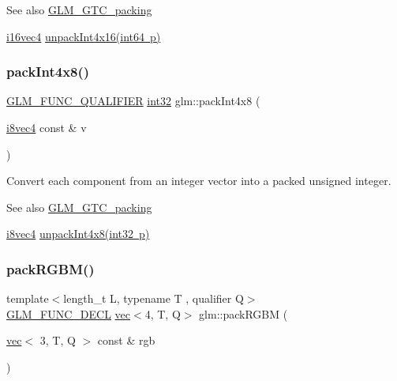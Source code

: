 \begin{DoxySeeAlso}{See also}
\mbox{\hyperlink{group__gtc__packing}{G\+L\+M\+\_\+\+G\+T\+C\+\_\+packing}} 

\mbox{\hyperlink{group__gtc__type__precision_ga99a249a4cc129cb527c48d3afd38b666}{i16vec4}} \mbox{\hyperlink{group__gtc__packing_ga625619888b95299a1ee0d9e50469c482}{unpack\+Int4x16(int64 p)}} 
\end{DoxySeeAlso}
\mbox{\label{group__gtc__packing_gac04277b39f9ca1ae2ca4840a3cb987e8}} 
\subsubsection{\texorpdfstring{pack\+Int4x8()}{packInt4x8()}}
{\footnotesize\ttfamily \mbox{\hyperlink{setup_8hpp_a33fdea6f91c5f834105f7415e2a64407}{G\+L\+M\+\_\+\+F\+U\+N\+C\+\_\+\+Q\+U\+A\+L\+I\+F\+I\+ER}} \mbox{\hyperlink{group__gtc__type__precision_ga632d8b25f6b61659f39ea4321fab92a4}{int32}} glm\+::pack\+Int4x8 (\begin{DoxyParamCaption}\item[{\mbox{\hyperlink{group__gtc__type__precision_gaaad99cfb998ddcb74e9c33d0149fdd0e}{i8vec4}} const \&}]{v }\end{DoxyParamCaption})}

Convert each component from an integer vector into a packed unsigned integer.

\begin{DoxySeeAlso}{See also}
\mbox{\hyperlink{group__gtc__packing}{G\+L\+M\+\_\+\+G\+T\+C\+\_\+packing}} 

\mbox{\hyperlink{group__gtc__type__precision_gaaad99cfb998ddcb74e9c33d0149fdd0e}{i8vec4}} \mbox{\hyperlink{group__gtc__packing_gaeed27076c5d26f4cca0d06637d3e878c}{unpack\+Int4x8(int32 p)}} 
\end{DoxySeeAlso}
\mbox{\label{group__gtc__packing_ga0466daf4c90f76cc64b3f105ce727295}} 
\subsubsection{\texorpdfstring{pack\+R\+G\+B\+M()}{packRGBM()}}
{\footnotesize\ttfamily template$<$length\+\_\+t L, typename T , qualifier Q$>$ \\
\mbox{\hyperlink{setup_8hpp_ab2d052de21a70539923e9bcbf6e83a51}{G\+L\+M\+\_\+\+F\+U\+N\+C\+\_\+\+D\+E\+CL}} \mbox{\hyperlink{structglm_1_1vec}{vec}}$<$4, T, Q$>$ glm\+::pack\+R\+G\+BM (\begin{DoxyParamCaption}\item[{\mbox{\hyperlink{structglm_1_1vec}{vec}}$<$ 3, T, Q $>$ const \&}]{rgb }\end{DoxyParamCaption})}

